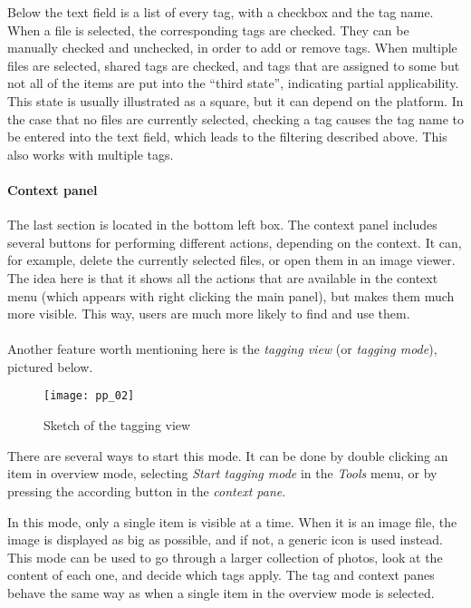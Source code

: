 Below the text field is a list of every tag, with a checkbox and the tag name.
When a file is selected, the corresponding tags are checked. They can be
manually checked and unchecked, in order to add or remove tags. When multiple
files are selected, shared tags are checked, and tags that are assigned to some
but not all of the items are put into the ``third state'', indicating partial
applicability. This state is usually illustrated as a square, but it can depend
on the platform. In the case that no files are currently selected, checking a
tag causes the tag name to be entered into the text field, which leads to the
filtering described above. This also works with multiple tags.

\paragraph{Context panel} The last section is located in the bottom left box.
The context panel includes several buttons for performing different actions,
depending on the context. It can, for example, delete the currently selected
files, or open them in an image viewer. The idea here is that it shows all the
actions that are available in the context menu (which appears with right
clicking the main panel), but makes them much more visible. This way, users are
much more likely to find and use them.

\paragraph{}
Another feature worth mentioning here is the \emph{tagging view} (or
\emph{tagging mode}), pictured below. %

\begin{figure}[!h]
	\centering
	\texttt{[image: pp\_02]}
	\caption{Sketch of the tagging view}
\end{figure}

There are several ways to start this mode. It can be done by double clicking
an item in overview mode, selecting \emph{Start tagging mode} in the
\emph{Tools} menu, or by pressing the according button in the \emph{context pane}.

In this mode, only a single item is visible at a time.
When it is an image file, the image is displayed as big as
possible, and if not, a generic icon is used instead. This mode can be used to
go through a larger collection of photos, look at the content of each one, and
decide which tags apply. The tag and context panes behave the same way as
when a single item in the overview mode is selected.

